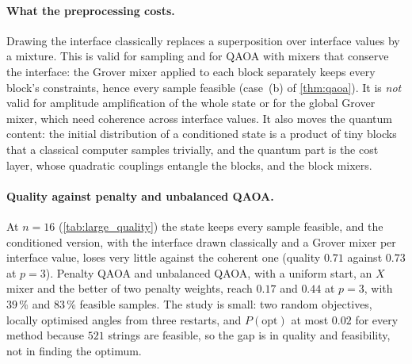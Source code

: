 \paragraph{What the preprocessing costs.} Drawing the interface classically replaces a superposition over interface values by a mixture. This is valid for sampling and for QAOA with mixers that conserve the interface: the Grover mixer applied to each block separately keeps every block's constraints, hence every sample feasible (case~(b) of \cref{thm:qaoa}). It is \emph{not} valid for amplitude amplification of the whole state or for the global Grover mixer, which need coherence across interface values. It also moves the quantum content: the initial distribution of a conditioned state is a product of tiny blocks that a classical computer samples trivially, and the quantum part is the cost layer, whose quadratic couplings entangle the blocks, and the block mixers.

\paragraph{Quality against penalty and unbalanced QAOA.} At $n=16$ (\cref{tab:large_quality}) the state keeps every sample feasible, and the conditioned version, with the interface drawn classically and a Grover mixer per interface value, loses very little against the coherent one (quality $0.71$ against $0.73$ at $p=3$). Penalty QAOA and unbalanced QAOA, with a uniform start, an $X$ mixer and the better of two penalty weights, reach $0.17$ and $0.44$ at $p=3$, with $39$\,\% and $83$\,\% feasible samples. The study is small: two random objectives, locally optimised angles from three restarts, and $P(\mathrm{opt})$ at most $0.02$ for every method because $521$ strings are feasible, so the gap is in quality and feasibility, not in finding the optimum.



